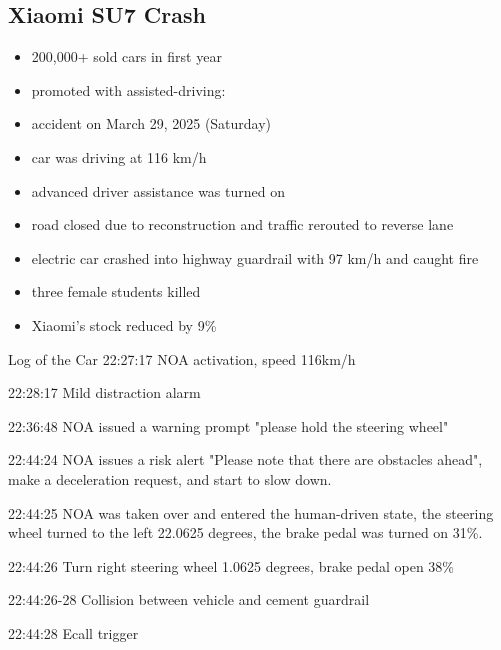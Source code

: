 \subsection{Xiaomi SU7 Crash} %
\begin{frame}{\insertsubsection}
	\begin{fancycolumns}[widths={45},animation=none]
		\begin{definition}{\insertsubsection{}}
			\begin{itemize}
				\item 200,000+ sold cars in first year
				\item promoted with assisted-driving: 
				\item accident on March 29, 2025 (Saturday)
				\item car was driving at 116 km/h
				\item advanced driver assistance was turned on
				\item road closed due to reconstruction and traffic rerouted to reverse lane
				\item electric car crashed into highway guardrail with 97 km/h and caught fire
				\item three female students killed
				\item Xiaomi's stock reduced by 9\%
			\end{itemize}
		\end{definition}
		\nextcolumn
		\vspace{-10mm}
		
		\small\centering{}
		\begin{note}{Log of the Car}
			22:27:17 NOA activation, speed 116km/h
			
			22:28:17 Mild distraction alarm
			
			22:36:48 NOA issued a warning prompt "please hold the steering wheel"
			
			22:44:24 NOA issues a risk alert "Please note that there are obstacles ahead", make a deceleration request, and start to slow down.
			
			22:44:25 NOA was taken over and entered the human-driven state, the steering wheel turned to the left 22.0625 degrees, the brake pedal was turned on 31\%.
			
			22:44:26 Turn right steering wheel 1.0625 degrees, brake pedal open 38\%
			
			22:44:26-28 Collision between vehicle and cement guardrail

			22:44:28 Ecall trigger
		\end{note}
	\end{fancycolumns}
\end{frame}

